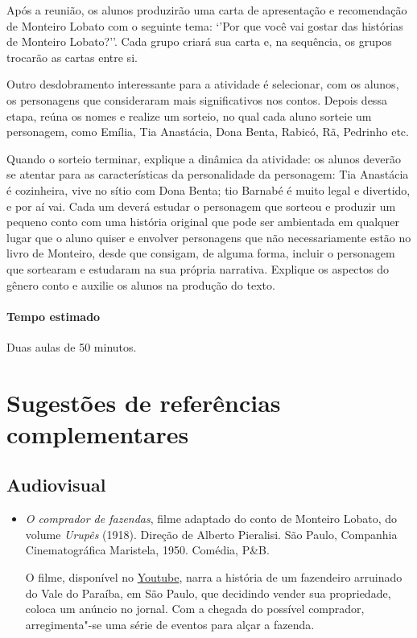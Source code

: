 \documentclass[11pt]{extarticle}
\begin{document}
Após a reunião, os alunos produzirão uma carta de apresentação e recomendação de Monteiro Lobato com o seguinte tema: ‘’Por que você vai gostar das histórias de Monteiro Lobato?’’. Cada grupo criará sua carta e, na sequência, os grupos trocarão as cartas entre si.

Outro desdobramento interessante para a atividade é selecionar, com os alunos, os personagens que consideraram mais significativos nos contos. 
Depois dessa etapa, reúna os nomes e realize um sorteio, no qual cada aluno sorteie um personagem, como Emília, Tia Anastácia, Dona Benta, Rabicó, Rã, Pedrinho etc.

Quando o sorteio terminar, explique a dinâmica da atividade: os alunos deverão se atentar para as características da personalidade da personagem: Tia Anastácia é cozinheira, vive no sítio com Dona Benta; tio Barnabé é muito legal e divertido, e por aí vai. 
Cada um deverá estudar o personagem que sorteou e produzir um pequeno conto com uma história original que pode ser ambientada em qualquer lugar que o aluno quiser e envolver personagens que não necessariamente estão no livro de Monteiro, desde que consigam, de alguma forma, incluir o personagem que sortearam e estudaram na sua própria narrativa. Explique os aspectos do gênero conto e auxilie os alunos na produção do texto.


\paragraph{Tempo estimado} Duas aulas de 50 minutos.

\section{Sugestões de referências complementares}

\subsection{Audiovisual}

\begin{itemize}

\item \textit{O comprador de fazendas}, filme adaptado do conto de Monteiro
Lobato, do volume \emph{Urupês} (1918). Direção de Alberto Pieralisi.
São Paulo, Companhia Cinematográfica Maristela, 1950. Comédia, P\&B.

O filme, disponível no \href{https://www.youtube.com/watch?v=LcdfdfD9_Bs}{Youtube}, 
narra a história de um fazendeiro arruinado do Vale do Paraíba, em
São Paulo, que decidindo vender sua propriedade, coloca um anúncio no jornal.
Com a chegada do possível comprador, arregimenta"-se uma série de eventos para 
alçar a fazenda. 
\end{itemize}
\end{document}
